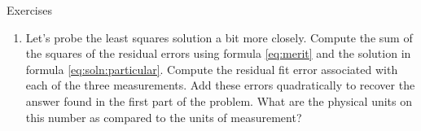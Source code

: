 \clearpage

\begin{xcb}{Exercises}
\begin{enumerate}
\item Let's probe the least squares solution a bit more closely.
\subitem Compute the sum of the squares of the residual errors using formula \eqref{eq:merit} and the solution in formula \eqref{eq:soln:particular}. 
\subitem Compute the residual fit error associated with each of the three measurements.
\subitem Add these errors quadratically to recover the answer found in the first part of the problem. 
\subitem What are the physical units on this number as compared to the units of measurement?
\end{enumerate}

\end{xcb}

\endinput